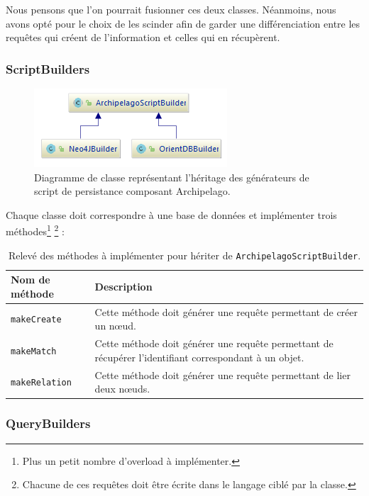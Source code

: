\documentclass[a4paper,fleqn,12pt,oneside]{book}
\begin{document}
Nous pensons que l'on pourrait fusionner ces deux classes. Néanmoins, nous avons opté pour le choix de les scinder afin de garder une différenciation entre les requêtes qui créent de l'information et celles qui en récupèrent.

\newpage
{}
\subsubsection{ScriptBuilders}


\begin{figure}[!ht]
\centering
\includegraphics[scale=1.5]{figures/scriptBuilders.png}
\caption{Diagramme de classe représentant l'héritage des générateurs de script de persistance composant Archipelago.}
\label{fig:ScriptQuery}
\end{figure}

Chaque classe doit correspondre à une base de données et implémenter trois méthodes\footnote{Plus un petit nombre d'overload à implémenter.} \footnote{Chacune de ces requêtes doit être écrite dans le langage ciblé par la classe.} :
\begin{table}[ht!]
\centering
\begin{tabular}[c]{|l|M{12cm}|}
\hline
\textbf{Nom de méthode} & \textbf{Description}  \tabularnewline
\hline
\texttt{makeCreate} &  Cette méthode doit générer une requête permettant de créer un nœud. \tabularnewline
\hline
\texttt{makeMatch} & Cette méthode doit générer une requête permettant de récupérer l'identifiant correspondant à un objet. \tabularnewline
\hline
\texttt{makeRelation} &  Cette méthode doit générer une requête permettant de lier deux nœuds.  \tabularnewline
\hline

\end{tabular}
\caption{Relevé des méthodes à implémenter pour hériter de \texttt{ArchipelagoScriptBuilder}.}
\label{tab:ArchipelagoScriptBuilder}
\end{table}
\newpage
{}
\subsubsection{QueryBuilders}
\end{document}

